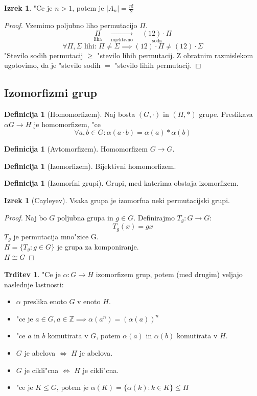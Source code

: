 \documentclass[11pt, a4paper]{article}
\theoremstyle{definition}
\newtheorem{defn}[counter]{Definicija}
\newtheorem{claim}[counter]{Trditev}
\newtheorem{theorem}[counter]{Izrek}
\theoremstyle{remark}
\newcommand{\Z}{\mathbb{Z}}
\begin{document}
	\begin{theorem}
		"Ce je $n > 1$, potem je $|A_n| = \frac{n!}{2}$
	\end{theorem}
	\begin{proof}
		Vzemimo poljubno liho permutacijo $\Pi$.
		\[ \underset{\text{liha}}{\Pi} \quad \underset{\text{injektivno}}{\rightarrow} \quad \underset{\text{soda}}{(12)\cdot\Pi} \]
		\[ \forall \Pi, \Sigma \text{ lihi: } \Pi \neq \Sigma \implies (12)\cdot\Pi \neq (12)\cdot\Sigma \]
		"Stevilo sodih permutacij $\geq$ "stevilo lihih permutacij. Z obratnim razmislekom ugotovimo, da je "stevilo sodih $=$ "stevilo lihih permutacij.
	\end{proof}

	\subsection{Izomorfizmi grup}
	\begin{defn}[Homomorfizem]
		Naj bosta $(G, \cdot)$ in $(H, *)$ grupe. Preslikava
		$\alpha G \rightarrow H$
		je homomorfizem, "ce
		\[ \forall a, b \in G: \alpha (a \cdot b) = \alpha(a) * \alpha (b) \]
	\end{defn}
	\begin{defn}[Avtomorfizem]
		Homomorfizem $G \rightarrow G$.
	\end{defn}
	\begin{defn}[Izomorfizem]
		Bijektivni homomorfizem.
	\end{defn}
	\begin{defn}[Izomorfni grupi]
		Grupi, med katerima obstaja izomorfizem.
	\end{defn}

	\begin{theorem}[Cayleyev]
		Vsaka grupa je izomorfna neki permutacijski grupi.
	\end{theorem}
	\begin{proof}
		Naj bo $G$ poljubna grupa in $g \in G$. Definirajmo $T_g: G \rightarrow G$:
		\[ T_g(x) = gx \]
		$T_g$ je permutacija mno"zice G. \\
		$H = \lbrace T_g: g \in G \rbrace$ je grupa za komponiranje. \\
		$H \cong G$
	\end{proof}

	\begin{claim}
		"Ce je $\alpha: G \rightarrow H$ izomorfizem grup, potem (med drugim) veljajo naslednje lastnosti:
		\begin{itemize}
			\item $\alpha$ preslika enoto $G$ v enoto $H$.
			\item "ce je $a \in G, a \in \Z \implies \alpha(a^n) = (\alpha(a))^n$
			\item "ce $a$ in $b$ komutirata v $G$, potem $\alpha(a)$ in $\alpha(b)$ komutirata v $H$.
			\item $G$ je abelova $\iff$ $H$ je abelova.
			\item $G$ je cikli"cna $\iff$ $H$ je cikli"cna.
			\item "ce je $K \leq G$, potem je $\alpha(K) = \lbrace \alpha(k): k \in K \rbrace \leq H$
		\end{itemize}
	\end{claim}
\end{document}
